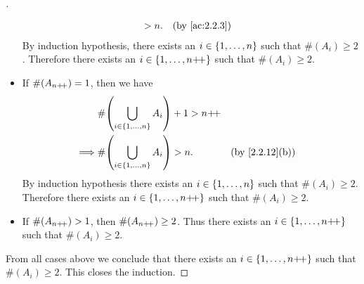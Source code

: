 \begin{proof}[]
\begin{itemize}
\begin{align*}
			                                                      & > n.                                           &  & \by{ac:2.2.3}
		      \end{align*}
		      By induction hypothesis, there exists an \(i \in \left\lbrace1, \dots, n\right\rbrace\) such that \(\#(A_i) \geq 2\).
		      Therefore there exists an \(i \in \left\lbrace1, \dots, n{+}\!{+}\right\rbrace\) such that \(\#(A_i) \geq 2\).
		\item If \(\#(A_{n{+}\!{+}}) = 1\), then we have
		      \begin{align*}
			               & \#\pa{\bigcup_{i \in \set{1, \dots, n}} A_i} + 1 > n\pp                     \\
			      \implies & \#\pa{\bigcup_{i \in \set{1, \dots, n}} A_i} > n.       &  & \by{2.2.12}[b]
		      \end{align*}
		      By induction hypothesis there exists an \(i \in \left\lbrace1, \dots, n\right\rbrace\) such that \(\#(A_i) \geq 2\).
		      Therefore there exists an \(i \in \left\lbrace1, \dots, n{+}\!{+}\right\rbrace\) such that \(\#(A_i) \geq 2\).
		\item If \(\#(A_{n{+}\!{+}}) > 1\), then \(\#(A_{n{+}\!{+}}) \geq 2\).
		      Thus there exists an \(i \in \left\lbrace1, \dots, n{+}\!{+}\right\rbrace\) such that \(\#(A_i) \geq 2\).
	\end{itemize}
	From all cases above we conclude that there exists an \(i \in \left\lbrace1, \dots, n{+}\!{+}\right\rbrace\) such that \(\#(A_i) \geq 2\).
	This closes the induction.
\end{proof}
